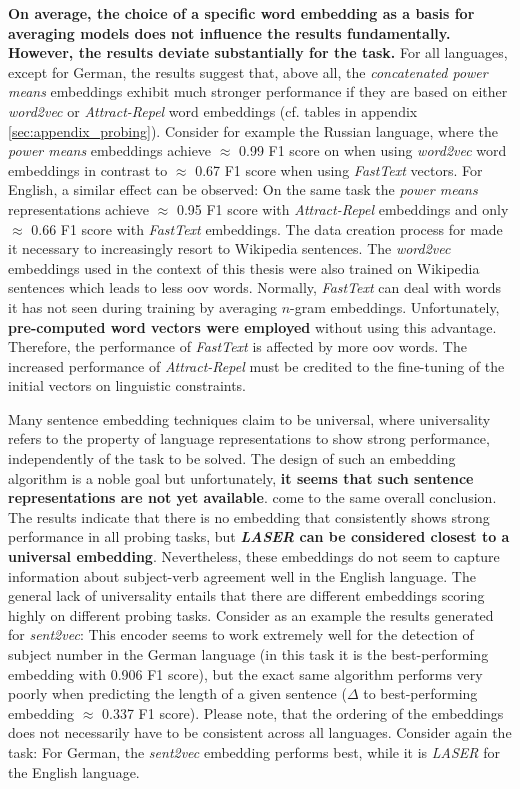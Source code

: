 \textbf{On average, the choice of a specific word embedding as a basis for averaging models does not influence the results fundamentally. However, the results deviate substantially for the  task.} For all languages, except for German, the results suggest that, above all, the \textit{concatenated power means} embeddings exhibit much stronger performance if they are based on either \textit{word2vec} or \textit{Attract-Repel} word embeddings (cf. tables in appendix \vref{sec:appendix_probing}). Consider for example the Russian language, where the \textit{power means} embeddings achieve $\approx$ 0.99 F1 score on  when using \textit{word2vec} word embeddings in contrast to $\approx$ 0.67 F1 score when using \textit{FastText} vectors. For English, a similar effect can be observed: On the same task the \textit{power means} representations achieve $\approx$ 0.95 F1 score with \textit{Attract-Repel} embeddings and only $\approx$ 0.66 F1 score with \textit{FastText} embeddings. The data creation process for  made it necessary to increasingly resort to Wikipedia sentences. The \textit{word2vec} embeddings used in the context of this thesis were also trained on Wikipedia sentences which leads to less \gls{oov} words. Normally, \textit{FastText} can deal with words it has not seen during training by averaging $n$-gram embeddings. Unfortunately, \textbf{pre-computed word vectors were employed} without using this advantage. Therefore, the performance of \textit{FastText} is affected by more \gls{oov} words. The increased performance of \textit{Attract-Repel} must be credited to the fine-tuning of the initial vectors on linguistic constraints.

 Many sentence embedding techniques claim to be universal, where universality refers to the property of language representations to show strong performance, independently of the task to be solved. The design of such an embedding algorithm is a noble goal but unfortunately, \textbf{it seems that such sentence representations are not yet available}. \citep{Perone.2018} come to the same overall conclusion. The results indicate that there is no embedding that consistently shows strong performance in all probing tasks, but \textbf{\textit{LASER} can be considered closest to a universal embedding}. Nevertheless, these embeddings do not seem to capture information about subject-verb agreement well in the English language. The general lack of universality entails that there are different embeddings scoring highly on different probing tasks. Consider as an example the results generated for \textit{sent2vec}: This encoder seems to work extremely well for the detection of subject number in the German language (in this task it is the best-performing embedding with 0.906 F1 score), but the exact same algorithm performs very poorly when predicting the length of a given sentence ($\Delta$ to best-performing embedding $\approx$ 0.337 F1 score). Please note, that the ordering of the embeddings does not necessarily have to be consistent across all languages. Consider again the  task: For German, the \textit{sent2vec} embedding performs best, while it is \textit{LASER} for the English language.

